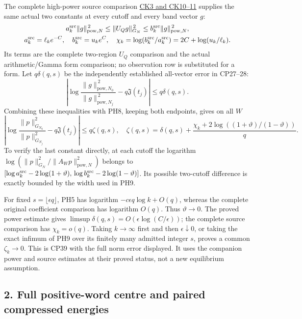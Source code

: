 \documentclass[10pt]{article}
\begin{document}
The complete high-power source comparison \href{https://github.com/KokunoYumeto/zeta-function-research-reader/blob/1447462732b40b1474bd9a819cf79257f5326ada/workbenches/splitzero-tandem/continuations/20260922-kernel-frequency/COMBINED_KERNEL_AND_RECEIVERS.md\#L101}{CK3 and CK10--11} supplies the same actual two constants at every cutoff and every band vector \(g\): \[
\begin{gathered}
 a_k^{\rm src}\|g\|_{\mathrm{pow},N}^{\,2}
 \le\|U_Qg\|_{G_N}^{\,2}
 \le b_k^{\rm src}\|g\|_{\mathrm{pow},N}^{\,2},\\
 a_k^{\rm src}=\ell_ke^{-C},\quad b_k^{\rm src}=u_ke^C,\quad
 \chi_k=\log(b_k^{\rm src}/a_k^{\rm src})=2C+\log(u_k/\ell_k).
 \end{gathered}
\] Its terms are the complete two-region \(U_Q\) comparison and the actual arithmetic/Gamma form comparison; no observation row is substituted for a form. Let \(q\delta(q,s)\) be the independently established all-vector error in CP27--28: \[
 \left|\log\frac{\|g\|_{\mathrm{pow},N_0}^{\,2}}
 {\|g\|_{\mathrm{pow},N_j}^{\,2}}
 -q\mathfrak J(t_j)\right|\le q\delta(q,s).
\] Combining these inequalities with PH8, keeping both endpoints, gives on all \(W\) \[
 \left|\log\frac{\|p\|_{G_{N_0}}^2}{\|p\|_{G_{N_j}}^2}
       -q\mathfrak J(t_j)\right|\le q\zeta(q,s),
 \quad
 \zeta(q,s)=\delta(q,s)+\frac{\chi_k+
 2\log((1+\vartheta)/(1-\vartheta))}{q}.
 \tag{PH9}
\] To verify the last constant directly, at each cutoff the logarithm \(\log(\|p\|_{G_N}^2/\|A_Wp\|_{\mathrm{pow},N}^2)\) belongs to \([\log a_k^{\rm src}-2\log(1+\vartheta),\,\log b_k^{\rm src}-2\log(1-\vartheta)]\). Its possible two-cutoff difference is exactly bounded by the width used in PH9.

For fixed \(s=\lfloor\epsilon q\rfloor\), PH5 has logarithm \(-c\epsilon q\log k+O(q)\), whereas the complete original coefficient comparison has logarithm \(O(q)\). Thus \(\vartheta\to0\). The proved power estimate gives \(\limsup\delta(q,s)=O(\epsilon\log(C/\epsilon))\); the complete source comparison has \(\chi_k=o(q)\). Taking \(k\to\infty\) first and then \(\epsilon\downarrow0\), or taking the exact infimum of PH9 over its finitely many admitted integer \(s\), proves a common \(\zeta_k\to0\). This is CP39 with the full norm error displayed. It uses the companion power and source estimates at their proved status, not a new equilibrium assumption.

\subsection{2. Full positive-word centre and paired compressed energies}\label{full-positive-word-centre-and-paired-compressed-energies}
\end{document}
